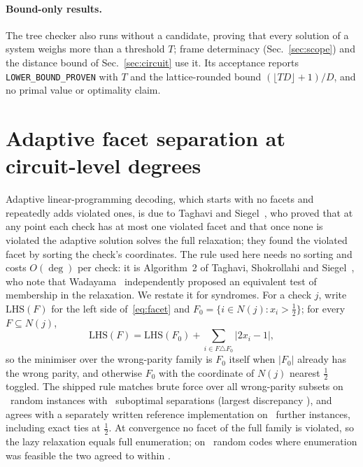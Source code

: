 \documentclass[aps,pra,twocolumn,superscriptaddress,nofootinbib,longbibliography,floatfix]{revtex4-2}
\begin{document}
\paragraph*{Bound-only results.} The tree checker also runs without a candidate, proving that every solution of a system weighs more than a threshold $T$; frame determinacy (Sec.~\ref{sec:scope}) and the distance bound of Sec.~\ref{sec:circuit} use it. Its acceptance reports \texttt{LOWER\_BOUND\_PROVEN} with $T$ and the lattice-rounded bound $(\lfloor TD\rfloor+1)/D$, and no primal value or optimality claim.

\section{Adaptive facet separation at circuit-level degrees}
\label{sec:separation}

Adaptive linear-programming decoding, which starts with no facets and repeatedly adds violated ones, is due to Taghavi and Siegel~\cite{taghavi2008adaptive}, who proved that at any point each check has at most one violated facet and that once none is violated the adaptive solution solves the full relaxation; they found the violated facet by sorting the check's coordinates. The rule used here needs no sorting and costs $O(\deg)$ per check: it is Algorithm~2 of Taghavi, Shokrollahi and Siegel~\cite{taghavi2011efficient}, who note that Wadayama~\cite{wadayama2010interior} independently proposed an equivalent test of membership in the relaxation. We restate it for syndromes. For a check $j$, write $\mathrm{LHS}(F)$ for the left side of~\eqref{eq:facet} and $F_0=\{i\in N(j):x_i>\tfrac12\}$; for every $F\subseteq N(j)$,
\[
\mathrm{LHS}(F)=\mathrm{LHS}(F_0)+\sum_{i\in F\triangle F_0}\bigl|2x_i-1\bigr| ,
\]
so the minimiser over the wrong-parity family is $F_0$ itself when $|F_0|$ already has the wrong parity, and otherwise $F_0$ with the coordinate of $N(j)$ nearest $\tfrac12$ toggled. The shipped rule matches brute force over all wrong-parity subsets on \SepInstances\ random instances with \SepSuboptimal\ suboptimal separations (largest discrepancy \SepWorstGap), and agrees with a separately written reference implementation on \SepRefInstances\ further instances, including exact ties at $\tfrac12$. At convergence no facet of the full family is violated, so the lazy relaxation equals full enumeration; on \EnsLazyCodes\ random codes where enumeration was feasible the two agreed to within \EnsLazyWorst.
\end{document}
